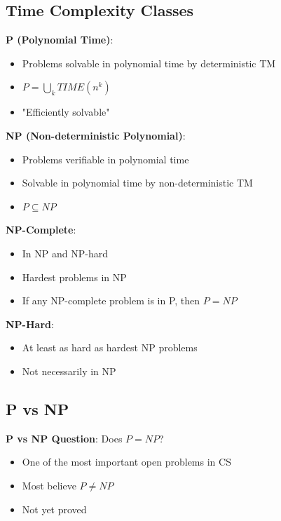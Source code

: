 \documentclass[12pt,a4paper]{report}
\begin{document}
\subsection{Time Complexity Classes}
\begin{concept}
\textbf{P (Polynomial Time)}:
\begin{itemize}
    \item Problems solvable in polynomial time by deterministic TM
    \item $P = \bigcup_{k} TIME(n^k)$
    \item "Efficiently solvable"
\end{itemize}

\textbf{NP (Non-deterministic Polynomial)}:
\begin{itemize}
    \item Problems verifiable in polynomial time
    \item Solvable in polynomial time by non-deterministic TM
    \item $P \subseteq NP$
\end{itemize}

\textbf{NP-Complete}:
\begin{itemize}
    \item In NP and NP-hard
    \item Hardest problems in NP
    \item If any NP-complete problem is in P, then $P = NP$
\end{itemize}

\textbf{NP-Hard}:
\begin{itemize}
    \item At least as hard as hardest NP problems
    \item Not necessarily in NP
\end{itemize}
\end{concept}

\subsection{P vs NP}
\begin{concept}
\textbf{P vs NP Question}: Does $P = NP$?
\begin{itemize}
    \item One of the most important open problems in CS
    \item Most believe $P \neq NP$
    \item Not yet proved
\end{itemize}
\end{concept}
\end{document}
